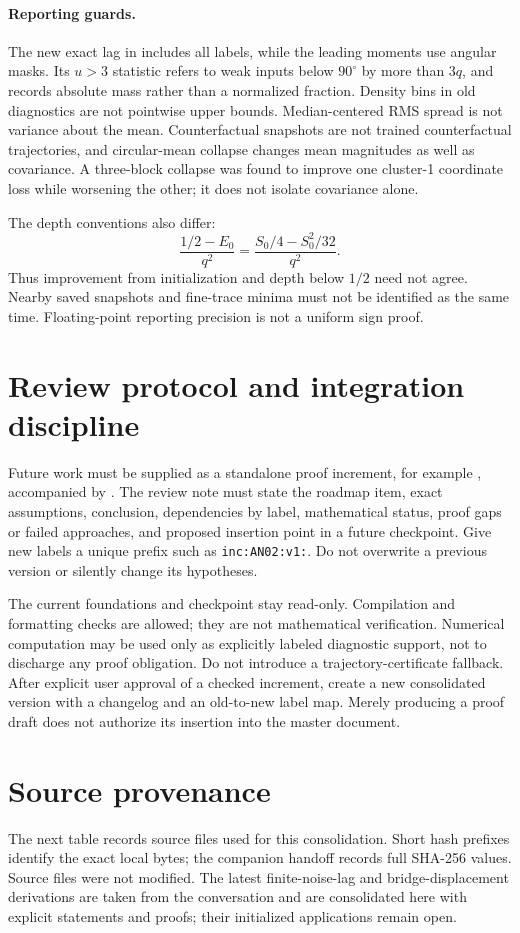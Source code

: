 \documentclass[11pt]{article}
\numberwithin{equation}{section}
\theoremstyle{definition}
\theoremstyle{remark}
\newcommand{\1}{\mathbf 1}
\begin{document}
\paragraph{Reporting guards.}
The new exact lag in \cite{D} includes all labels, while the leading moments
use angular masks. Its $u>3$ statistic refers to weak inputs below
$90^\circ$ by more than $3q$, and records absolute mass rather than a
normalized fraction. Density bins in old diagnostics are not pointwise
upper bounds. Median-centered RMS spread is not variance about the mean.
Counterfactual snapshots are not trained counterfactual trajectories, and
circular-mean collapse changes mean magnitudes as well as covariance.
A three-block collapse was found to improve one cluster-1 coordinate loss
while worsening the other; it does not isolate covariance alone.

The depth conventions also differ:
\[
 \frac{1/2-E_0}{q^2}=\frac{S_0/4-S_0^2/32}{q^2}.
\]
Thus improvement from initialization and depth below $1/2$ need not agree.
Nearby saved snapshots and fine-trace minima must not be identified as the
same time. Floating-point reporting precision is not a uniform sign proof.

\section{Review protocol and integration discipline}\label{pa:review}
Future work must be supplied as a standalone proof increment, for example
, accompanied by
. The review note must state the
roadmap item, exact assumptions, conclusion, dependencies by label,
mathematical status, proof gaps or failed approaches, and proposed insertion
point in a future checkpoint. Give new labels a unique prefix such as
\verb|inc:AN02:v1:|. Do not overwrite a previous version or silently change
its hypotheses.

The current foundations and checkpoint stay read-only. Compilation and
formatting checks are allowed; they are not mathematical verification.
Numerical computation may be used only as explicitly labeled diagnostic
support, not to discharge any proof obligation. Do not introduce a
trajectory-certificate fallback. After explicit user approval of a checked
increment, create a new consolidated version with a changelog and an
old-to-new label map. Merely producing a proof draft does not authorize its
insertion into the master document.

\section{Source provenance}\label{pa:provenance}
The next table records source files used for this consolidation. Short hash
prefixes identify the exact local bytes; the companion handoff records full
SHA-256 values. Source files were not modified. The latest finite-noise-lag
and bridge-displacement derivations are taken from the conversation and
are consolidated here with explicit statements and proofs; their initialized
applications remain open.
\end{document}
